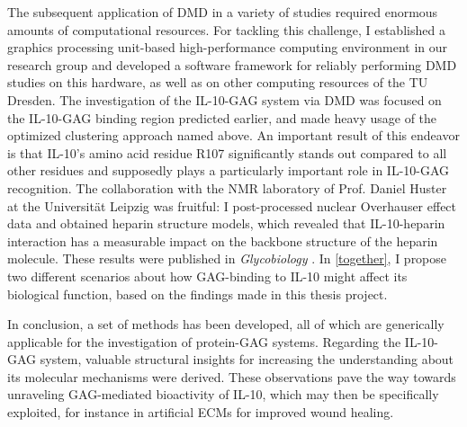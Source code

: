 The subsequent application of DMD in a variety of studies required enormous
amounts of computational resources. For tackling this challenge, I established a
graphics processing unit-based high-performance computing environment in our
research group and developed a software framework for reliably performing DMD
studies on this hardware, as well as on other computing resources of the TU
Dresden. The investigation of the IL-10-GAG system via DMD was focused on the
IL-10-GAG binding region predicted earlier, and made heavy usage of the
optimized clustering approach named above. An important result of this endeavor
is that IL-10's amino acid residue R107 significantly stands out compared to all
other residues and supposedly plays a particularly important role in IL-10-GAG
recognition. The collaboration with the NMR laboratory of Prof. Daniel Huster at
the Universität Leipzig was fruitful: I post-processed nuclear Overhauser effect
data and obtained heparin structure models, which revealed that IL-10-heparin
interaction has a measurable impact on the backbone structure of the heparin
molecule. These results were published in \textit{Glycobiology}
\cite{kuenze_gehrcke_2014}. In \cref{together}, I propose two different
scenarios about how GAG-binding to IL-10 might affect its biological function,
based on the findings made in this thesis project.

In conclusion, a set of methods has been developed, all of which are generically
applicable for the investigation of protein-GAG systems. Regarding the IL-10-GAG
system, valuable structural insights for increasing the understanding about its
molecular mechanisms were derived. These observations pave the way towards
unraveling GAG-mediated bioactivity of IL-10, which may then be specifically
exploited, for instance in artificial ECMs for improved wound healing.
